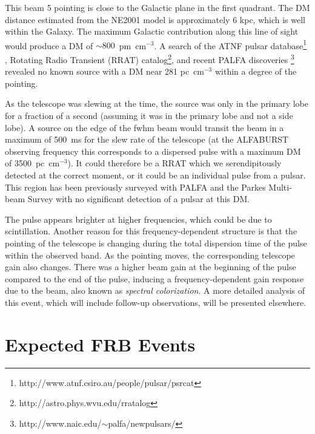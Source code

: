 \documentclass[a4paper,fleqn,usenatbib]{mnras}
\begin{document}
This beam 5 pointing is close to the Galactic plane in the first quadrant. The
DM distance estimated from the NE2001 model \citep{2002astro.ph..7156C} is
approximately 6 kpc, which is well within the Galaxy. The maximum Galactic
contribution along this line of sight would produce a DM of
$\sim800$~pm~cm$^{-3}$.  A search of the ATNF pulsar
database\footnote{http://www.atnf.csiro.au/people/pulsar/psrcat}
\citep{2005AJ....129.1993M}, Rotating Radio Transient (RRAT)
catalog\footnote{http://astro.phys.wvu.edu/rratalog}, and recent PALFA
discoveries \footnote{http://www.naic.edu/$\sim$palfa/newpulsars/} revealed no
known source with a DM near 281 pc~cm$^{-3}$ within a degree of the pointing.

As the telescope was slewing at the time, the source was only in the primary
lobe for a fraction of a second (assuming it was in the primary lobe and not a
side lobe). A source on the edge of the \gls{fwhm} beam would transit the beam
in a maximum of 500~ms for the slew rate of the telescope (at the ALFABURST
observing frequency this corresponds to a dispersed pulse with a maximum DM of
3500~pc~cm$^{-3}$).  It could therefore be a RRAT which we serendipitously
detected at the correct moment, or it could be an individual pulse from a
pulsar. This region has been previously surveyed with PALFA and the Parkes
Multi-beam Survey \citep{2001MNRAS.328...17M} with no significant detection of a
pulsar at this DM.

The pulse appears brighter at higher frequencies, which could be due to
scintillation. Another reason for this frequency-dependent structure is that the
pointing of the telescope is changing during the total dispersion time of the
pulse within the observed band. As the pointing moves, the corresponding
telescope gain also changes.  There was a higher beam gain at the beginning of
the pulse compared to the end of the pulse, inducing a frequency-dependent gain
response due to the beam, also known as \emph{spectral colorization}.  A more
detailed analysis of this event, which will include follow-up observations, will
be presented elsewhere.



\section{Expected FRB Events}
\label{sec:event_rates}
\end{document}
